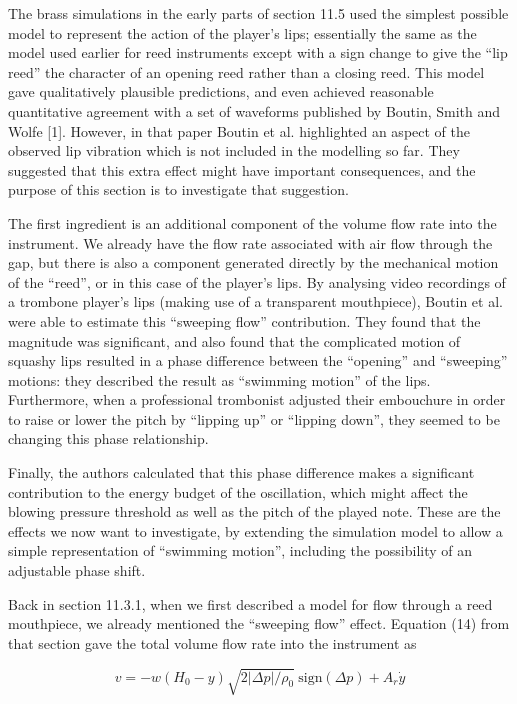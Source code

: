   The brass simulations in the early parts of section 11.5 used the simplest 
  possible model to represent the action of the player's lips; essentially the 
  same as the model used earlier for reed instruments except with a sign change 
  to give the ``lip reed'' the character of an opening reed rather than a 
  closing reed. This model gave qualitatively plausible predictions, and even 
  achieved reasonable quantitative agreement with a set of waveforms published 
  by Boutin, Smith and Wolfe [1]. However, in that paper Boutin et al. 
  highlighted an aspect of the observed lip vibration which is not included in 
  the modelling so far. They suggested that this extra effect might have 
  important consequences, and the purpose of this section is to investigate 
  that suggestion. 

  The first ingredient is an additional component of the volume flow rate into 
  the instrument. We already have the flow rate associated with air flow 
  through the gap, but there is also a component generated directly by the 
  mechanical motion of the ``reed'', or in this case of the player's lips. By 
  analysing video recordings of a trombone player's lips (making use of a 
  transparent mouthpiece), Boutin et al. were able to estimate this ``sweeping 
  flow'' contribution. They found that the magnitude was significant, and also 
  found that the complicated motion of squashy lips resulted in a phase 
  difference between the ``opening'' and ``sweeping'' motions: they described 
  the result as ``swimming motion'' of the lips. Furthermore, when a 
  professional trombonist adjusted their embouchure in order to raise or lower 
  the pitch by ``lipping up'' or ``lipping down'', they seemed to be changing 
  this phase relationship. 

  Finally, the authors calculated that this phase difference makes a 
  significant contribution to the energy budget of the oscillation, which might 
  affect the blowing pressure threshold as well as the pitch of the played 
  note. These are the effects we now want to investigate, by extending the 
  simulation model to allow a simple representation of ``swimming motion'', 
  including the possibility of an adjustable phase shift. 

  Back in section 11.3.1, when we first described a model for flow through a 
  reed mouthpiece, we already mentioned the ``sweeping flow'' effect. Equation 
  (14) from that section gave the total volume flow rate into the instrument as 

  \begin{equation*}v=-w(H_0-y) \sqrt{2 |\Delta p|/\rho_0} \mathrm{~sign} 
  (\Delta p)+A_r \dot{y} \tag{1}\end{equation*} 

